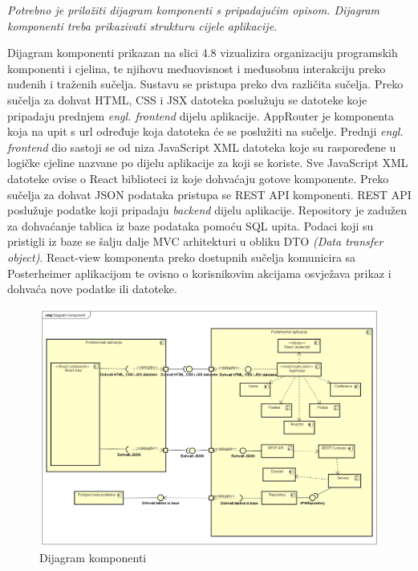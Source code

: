 			 \textit{Potrebno je priložiti dijagram komponenti s pripadajućim opisom. Dijagram komponenti treba prikazivati strukturu cijele aplikacije.}
			 
			 \indent Dijagram komponenti prikazan na slici 4.8 vizualizira organizaciju programskih komponenti i cjelina, te njihovu međuovisnost i međusobnu interakciju preko nuđenih i traženih sučelja. Sustavu se pristupa preko dva različita sučelja. Preko sučelja za dohvat HTML, CSS i JSX datoteka poslužuju se datoteke koje pripadaju prednjem \textit{engl. frontend} dijelu aplikacije. AppRouter je komponenta koja na upit s url određuje koja datoteka će se poslužiti na sučelje. Prednji \textit{engl. frontend} dio sastoji se od niza JavaScript XML datoteka koje su raspoređene u logičke cjeline nazvane po dijelu aplikacije za koji se koriste. Sve JavaScript XML datoteke ovise o React biblioteci iz koje dohvaćaju gotove komponente. Preko sučelja za dohvat JSON podataka pristupa se REST API komponenti. REST API poslužuje podatke koji pripadaju \textit{backend} dijelu aplikacije. Repository je zadužen za dohvaćanje tablica iz baze podataka pomoću SQL upita. Podaci koji su pristigli iz baze se šalju dalje MVC arhitekturi u obliku DTO \textit{(Data transfer object)}. React-view komponenta preko dostupnih sučelja komunicira sa Posterheimer aplikacijom te ovisno o korisnikovim akcijama osvježava prikaz i dohvaća nove podatke ili datoteke.
			 
			 \begin{figure}
			 	\includegraphics[width=\linewidth]{Slike/ComponentDiagram}
			 	\caption{Dijagram komponenti}
			 \end{figure}